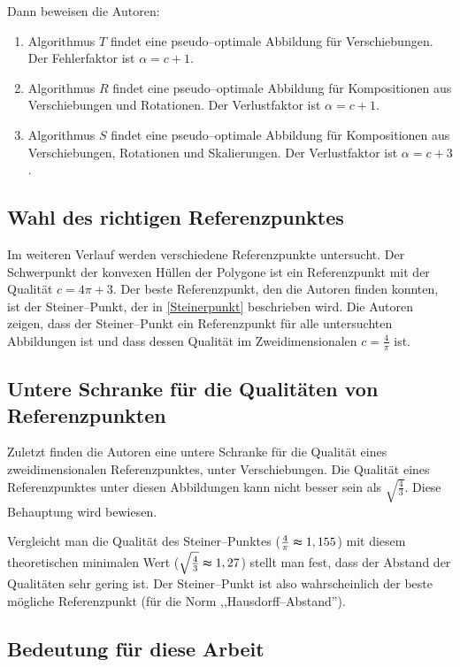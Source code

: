 Dann beweisen die Autoren:
\begin{enumerate}
\item Algorithmus $T$ findet eine pseudo--optimale Abbildung für Verschiebungen. Der Fehlerfaktor ist $\alpha=c+1$.
\item Algorithmus $R$ findet eine pseudo--optimale Abbildung für Kompositionen aus Verschiebungen und Rotationen.  Der Verlustfaktor ist $\alpha=c+1$.
\item Algorithmus $S$ findet eine pseudo--optimale Abbildung für Kompositionen aus Verschiebungen, Rotationen und Skalierungen. Der Verlustfaktor ist $\alpha=c+3$.
\end{enumerate}

\subsection{Wahl des richtigen Referenzpunktes}

Im weiteren Verlauf werden verschiedene Referenzpunkte untersucht. Der Schwerpunkt der konvexen Hüllen der Polygone ist ein Referenzpunkt mit der Qualität $c=4\pi+3$. Der beste Referenzpunkt, den die Autoren finden konnten, ist der Steiner--Punkt, der in \vref{Steinerpunkt} beschrieben wird. Die Autoren zeigen, dass der Steiner--Punkt ein Referenzpunkt für alle untersuchten Abbildungen ist und dass dessen Qualität im Zweidimensionalen $c=\frac{4}{\pi}$ ist. 

\subsection{Untere Schranke für die Qualitäten von Referenzpunkten}

Zuletzt finden die Autoren eine untere Schranke für die Qualität eines zweidimensionalen Referenzpunktes, unter Verschiebungen. Die Qualität eines Referenzpunktes unter diesen Abbildungen kann nicht besser sein als $\sqrt{\frac{4}{3}}$. Diese Behauptung wird bewiesen. 

Vergleicht man die Qualität des Steiner--Punktes ($\frac{4}{\pi}\thickapprox 1,155$) mit diesem theoretischen minimalen Wert ($\sqrt{\frac{4}{3}}\thickapprox 1,27$) stellt man fest, dass der Abstand der Qualitäten sehr gering ist. Der Steiner--Punkt ist also wahrscheinlich der beste mögliche Referenzpunkt (für die Norm ,,Hausdorff--Abstand'').

\subsection{Bedeutung für diese Arbeit}\label{BedeutungAAR}

